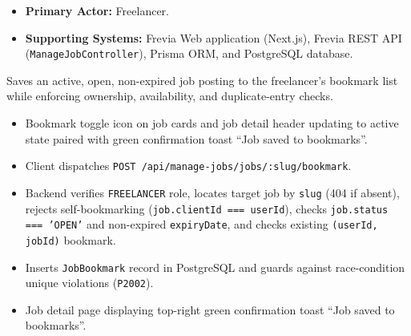\begin{itemize}[leftmargin=1.6em,topsep=3pt,itemsep=2pt,parsep=0pt,label=$\bullet$]
    \item \textbf{Primary Actor:} Freelancer.
    \item \textbf{Supporting Systems:} Frevia Web application (Next.js), Frevia REST API (\texttt{ManageJobController}), Prisma ORM, and PostgreSQL database.
\end{itemize}

\noindent Saves an active, open, non-expired job posting to the freelancer's bookmark list while enforcing ownership, availability, and duplicate-entry checks.

\begin{itemize}[leftmargin=1.6em,topsep=3pt,itemsep=2pt,parsep=0pt,label=$\bullet$]
    \item Bookmark toggle icon on job cards and job detail header updating to active state paired with green confirmation toast ``Job saved to bookmarks''.
\end{itemize}

\begin{itemize}[leftmargin=1.6em,topsep=3pt,itemsep=2pt,parsep=0pt,label=$\bullet$]
    \item Client dispatches \texttt{POST /\allowbreak{}api/\allowbreak{}manage-\allowbreak{}jobs/\allowbreak{}jobs/\allowbreak{}:\allowbreak{}slug/\allowbreak{}bookmark}.
    \item Backend verifies \texttt{FREELANCER} role, locates target job by \texttt{slug} (404 if absent), rejects self-bookmarking (\texttt{job.clientId === userId}), checks \texttt{job.status === 'OPEN'} and non-expired \texttt{expiryDate}, and checks existing \texttt{(userId, jobId)} bookmark.
    \item Inserts \texttt{JobBookmark} record in PostgreSQL and guards against race-condition unique violations (\texttt{P2002}).
\end{itemize}

\begin{itemize}[leftmargin=1.6em,topsep=3pt,itemsep=2pt,parsep=0pt,label=$\bullet$]
    \item Job detail page displaying top-right green confirmation toast ``Job saved to bookmarks''.
\end{itemize}

